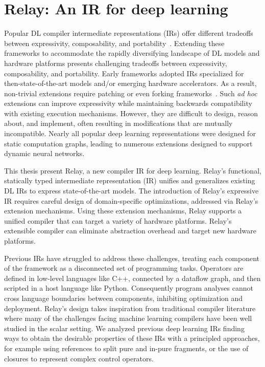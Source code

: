 \chapter{Relay: An IR for deep learning}
\label{ch:relay}

Popular DL compiler intermediate representations (IRs) offer different tradeoffs
between expressivity, composability, and portability~\citep{
  tensorflow, pytorch_ad, chainer_learningsys2015, tangent, theano, glow}.
Extending these frameworks to accommodate
  the rapidly diversifying landscape of
  DL models and hardware platforms presents
  challenging tradeoffs between
  expressivity, composability, and portability.
Early frameworks adopted IRs
  specialized for then-state-of-the-art models and/or
  emerging hardware accelerators.
As a result, non-trivial extensions require
  patching or even forking frameworks~\citep{
    tf_fold, tf_lite, tangent, tf_eager, xla, glow, torchscript}.
Such \textit{ad hoc} extensions can improve expressivity
  while maintaining backwards compatibility with existing execution mechanisms.
However, they are difficult to design, reason about, and implement,
  often resulting in modifications that are mutually incompatible.
Nearly all popular deep learning representations were designed for
  static computation graphs, leading to numerous
  extensions designed to support dynamic neural networks.

This thesis present Relay,
  a new compiler IR for deep learning.
Relay's functional, statically typed intermediate representation (IR)
  unifies and generalizes existing DL IRs
  to express state-of-the-art models.
The introduction of Relay's expressive IR requires
  careful design of domain-specific optimizations,
  addressed via Relay's extension mechanisms.
Using these extension mechanisms,
  Relay supports a unified compiler that
  can target a variety of hardware platforms.
Relay's extensible compiler
   can eliminate abstraction overhead and
   target new hardware platforms.

Previous IRs have struggled to address these challenges, treating each
  component of the framework as a disconnected set of programming tasks.
Operators are defined in low-level languages like C++,
  connected by a dataflow graph, and then scripted
  in a host language like Python.
Consequently
  program analyses cannot cross language boundaries between components,
  inhibiting optimization and deployment.
Relay's design takes inspiration from traditional
  compiler literature where many of the challenges facing
  machine learning compilers have been well studied in the scalar setting.
We analyzed previous deep learning IRs finding ways
  to obtain the desirable properties of these IRs
  with a principled approaches, for example using references
  to split pure and in-pure fragments, or the use of closures
  to represent complex control operators.

